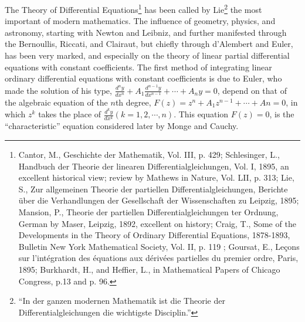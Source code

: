 \documentclass[oneside]{book}
\begin{document}
{The Theory of Differential Equations\footnote{Cantor, M.,
Geschichte der Mathematik, Vol. III, p. 429; Schlesinger, L.,
Handbuch der
Theorie der linearen Differentialgleichungen, Vol. I, 1895, an
excellent historical view; review by Mathews in Nature, Vol. LII,
p. 313; Lie, S., Zur allgemeinen Theorie der partiellen
Differentialgleichungen, Berichte \"uber die Verhandlungen der
Gesellschaft der Wissenschaften zu Leipzig, 1895; Mansion, P.,
Theorie der partiellen Differentialgleichungen ter Ordnung, German
by Maser, Leipzig, 1892, excellent on history; Craig, T., Some of
the Developments in the Theory of Ordinary Differential Equations,
1878-1893, Bulletin New York Mathematical Society, Vol. II, p. 119 ;
Goursat, E., Le\c{c}ons sur l'int\'egration des \'equations aux
d\'eriv\'ees partielles du premier ordre, Paris, 1895; Burkhardt,
H., and Heffier, L., in Mathematical Papers of Chicago Congress,
p.13 and p. 96.} has been called by Lie\footnote{``In der ganzen
modernen Mathematik ist die Theorie der Differentialgleichungen die
wichtigste Disciplin.''} the most important of modern
mathematics. The influence of geometry, physics, and astronomy,
starting with Newton and Leibniz, and further manifested through the
Bernoullis, Riccati, and Clairaut, but chiefly through d'Alembert
and Euler, has been very marked, and especially on the theory of
linear partial differential equations with constant coefficients.
The first method of integrating linear ordinary differential
equations with constant coefficients is due to Euler, who made the
solution of his type, $\frac {d^{n}y} {dx^{n}} + A_{1}\frac
{d^{n-1}y} {dx^{n-1}} + \cdots + A_{n}y = 0$, depend on that of the
algebraic equation of the
$n$th degree, $F(z) = z^{n} + A_{1}z^{n-1} + \cdots + An = 0$, in
which $z^{k}$ takes the place of $\frac {d^{k}y} {dx^{k}} (k = 1, 2,
\cdots, n)$. This equation $F(z) = 0$, is the ``characteristic''
equation considered later by Monge and Cauchy.

}
\end{document}
